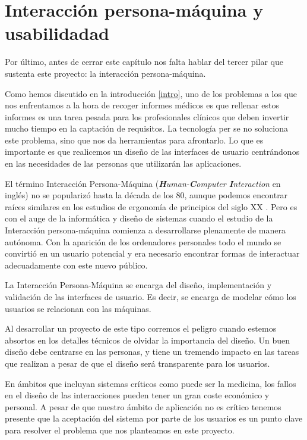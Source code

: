 \section{Interacción persona-máquina y usabilidadad}\label{sec:UI}
Por último, antes de cerrar este capítulo nos falta hablar del tercer pilar que sustenta este proyecto: la interacción persona-máquina.\par
Como hemos discutido en la introducción \ref{intro}, uno de los problemas a los que nos enfrentamos a la hora de recoger informes médicos es que rellenar estos informes es una tarea pesada para los profesionales clínicos que deben invertir mucho tiempo en la captación de requisitos. La tecnología per se no soluciona este problema, sino que nos da herramientas para afrontarlo. Lo que es importante es que realicemos un diseño de las interfaces de usuario centrándonos en las necesidades de las personas que utilizarán las aplicaciones.\medskip\par
El término Interacción Persona-Máquina (\textit{\textbf{H}uman-\textbf{C}omputer \textbf{I}nteraction} en inglés) no se popularizó hasta la década de los 80, aunque podemos encontrar raíces similares en los estudios de ergonomía de principios del siglo XX \cite{dix2004human}. Pero es con el auge de la informática y diseño de sistemas cuando el estudio de la Interacción persona-máquina comienza a desarrollarse plenamente de manera autónoma. Con la aparición de los ordenadores personales todo el mundo se convirtió en un usuario potencial y era necesario encontrar formas de interactuar adecuadamente con este nuevo público. \par
La Interacción Persona-Máquina se encarga del diseño, implementación y validación de las interfaces de usuario. Es decir, se encarga de modelar cómo los usuarios se relacionan con las máquinas.\medskip\par
Al desarrollar un proyecto de este tipo corremos el peligro cuando estemos absortos en los detalles técnicos de olvidar la importancia del diseño. Un buen diseño debe centrarse en las personas, y tiene un tremendo impacto en las tareas que realizan a pesar de que el diseño será transparente para los usuarios.\par
En ámbitos que incluyan sistemas críticos como puede ser la medicina, los fallos en el diseño de las interacciones pueden tener un gran coste económico y personal. A pesar de que nuestro ámbito de aplicación no es crítico tenemos presente que la aceptación del sistema por parte de los usuarios es un punto clave para resolver el problema que nos planteamos en este proyecto.\medskip \par
